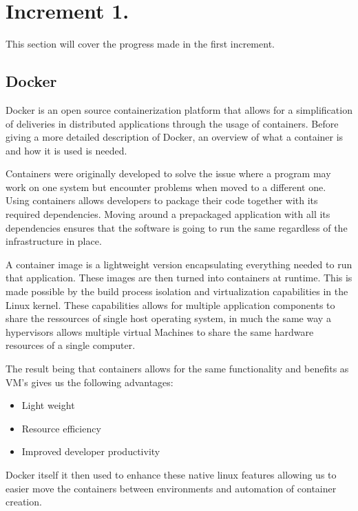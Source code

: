\section{Increment 1.}
This section will cover the progress made in the first increment. 


\subsection{Docker}
Docker is an open source containerization platform that allows for a simplification of deliveries in distributed applications through the usage of containers. 
Before giving a more detailed description of Docker, an overview of what a container is and how it is used is needed. 


Containers were originally developed to solve the issue where a program may work on one system but encounter problems when moved to a different one. 
Using containers allows developers to package their code together with its required dependencies. 
Moving around a prepackaged application with all its dependencies ensures that the software is going to run the same regardless of the infrastructure in place. 


A container image is a lightweight version encapsulating everything needed to run that application. These images are then turned into containers at runtime. 
This is made possible by the build process isolation and virtualization capabilities in the Linux kernel. 
These capabilities allows for multiple application components to share the ressources of single host operating system, 
in much the same way a hypervisors allows multiple virtual Machines to share the same hardware resources of a single computer. 


The result being that containers allows for the same functionality and benefits as VM’s gives us the following advantages:

\begin{itemize}
    \item Light weight 
    \item Resource efficiency
    \item Improved developer productivity
\end{itemize}

Docker itself it then used to enhance these native linux features allowing us to easier move the containers between environments and automation of container creation.

